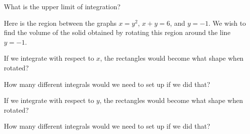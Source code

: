 
What is the upper limit of integration?



\endedxproblem

\endedxvertical





Here is the region between the graphs $x = y^2$, $x+y = 6$, and $y = -1$.  We
wish to find the volume of the solid obtained by rotating this region around the line
$y = -1$.  

If we integrate with respect to $x$, the rectangles would become what shape when rotated?
 

How many different integrals would we need to set up if we did that?  


If we integrate with respect to $y$, the rectangles would become what shape when rotated?
 

How many different integrals would we need to set up if we did that?  




\endedxproblem



\endedxvertical

